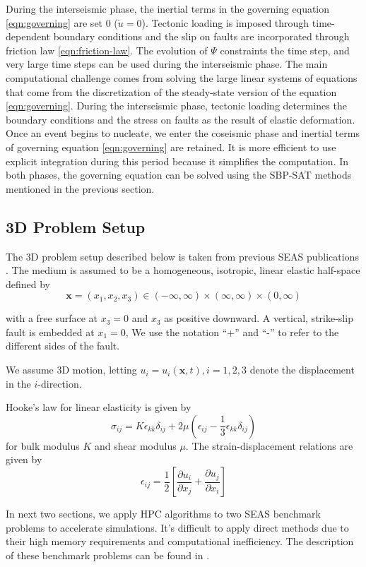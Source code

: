 During the interseismic phase, the inertial terms in the governing equation \ref{eqn:governing} are set 0 ($\ddot{u} = 0$).
Tectonic loading is imposed through time-dependent boundary conditions and the slip on faults are incorporated through friction law \ref{eqn:friction-law}.
The evolution of $\Psi$ constraints the time step, and very large time steps can be used during the interseismic phase.
The main computational challenge comes from solving the large linear systems of equations that come from the discretization of the steady-state version of the equation \ref{eqn:governing}.
During the interseismic phase, tectonic loading determines the boundary conditions and the stress on faults as the result of elastic deformation.
Once an event begins to nucleate, we enter the coseismic phase and inertial terms of governing equation \ref{eqn:governing} are retained.
It is more efficient to use explicit integration during this period because it simplifies the computation. In both phases, the governing equation can be solved using the SBP-SAT methods mentioned in the previous section.

\subsection{3D Problem Setup}
The 3D problem setup described below is taken from previous SEAS publications \cite{10.1785/0220190248}.
The medium is assumed to be a homogeneous, isotropic, linear elastic half-space defined by
\begin{equation} \label{eqn:domain}
    \textbf{x} = (x_1, x_2, x_3) \in (-\infty, \infty) \times (\infty, \infty) \times (0, \infty)
\end{equation}

with a free surface at $x_3 = 0$ and $x_3$ as positive downward. A vertical, strike-slip fault is embedded at $x_1 = 0$, We use the notation ``+'' and ``-'' to refer to the different sides of the fault. 

We assume 3D motion, letting $u_i = u_i(\textbf{x}, t), i = 1, 2, 3$ denote the displacement in the $i$-direction.

Hooke’s law for linear elasticity is given by
\begin{equation}
    \sigma_{ij} = K\epsilon_{kk}\delta_{ij} + 2\mu (\epsilon_{ij} - \frac{1}{3} \epsilon_{kk}\delta_{ij})
\end{equation}
for bulk modulus $K$ and shear modulus $\mu$. The strain-displacement relations are given by 
\begin{equation}
    \epsilon_{ij} = \frac{1}{2} \left[\frac{\partial u_i}{\partial x_j} + \frac{\partial u_j}{\partial x_i}\right]
\end{equation}

In next two sections, we apply HPC algorithms to two SEAS benchmark problems to accelerate simulations.
It's difficult to apply direct methods due to their high memory requirements and computational inefficiency. 
The description of these benchmark problems can be found in \cite{erickson2018seas,jiang2020seas}.